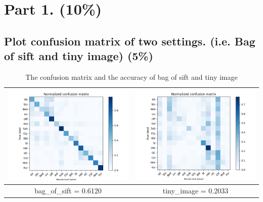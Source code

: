 \documentclass[a4paper, 12pt]{article}
\begin{document}
\section{Part 1. (10\%)}
\subsection{Plot confusion matrix of two settings. (i.e. Bag of sift and tiny image) (5\%)}
\begin{table}[!htb]
  \centering
  \caption{The confusion matrix and the accuracy of bag of sift and tiny image}
  \begin{tabular}{|c|c|}
    \hline
    \includegraphics[scale=0.5]{p1/bag_of_sift.png} & \includegraphics[scale=0.5]{p1/tiny_image.png} \\
    \hline
    bag\_of\_sift = 0.6120                          & tiny\_image = 0.2033                           \\
    \hline
  \end{tabular}
\end{table}
\end{document}
